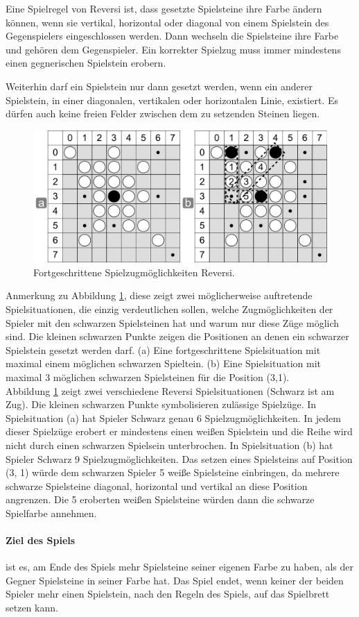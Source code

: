 Eine Spielregel von Reversi ist, dass gesetzte Spielsteine ihre Farbe ändern können, wenn sie vertikal, horizontal oder diagonal von einem Spielstein des Gegenspielers eingeschlossen werden. Dann wechseln die Spielsteine ihre Farbe und gehören dem Gegenspieler. Ein korrekter Spielzug muss immer mindestens einen gegnerischen Spielstein erobern. 

Weiterhin  darf ein Spielstein nur dann gesetzt werden, wenn ein anderer Spielstein, in einer diagonalen, vertikalen oder horizontalen Linie, existiert. Es dürfen auch keine freien Felder zwischen dem zu setzenden Steinen liegen. \\

\begin{figure}[!htbp]
  \centering
  \includegraphics[scale=0.5]{inhalt/abbildungen/zuege_schwarz_reversi.pdf}
  \caption{Fortgeschrittene Spielzugmöglichkeiten Reversi.}
  \label{fig:zuege_schwarz_reversi}
\end{figure}

Anmerkung zu Abbildung \ref{fig:zuege_schwarz_reversi}, diese zeigt zwei möglicherweise auftretende Spielsituationen, die einzig verdeutlichen sollen, welche Zugmöglichkeiten der Spieler mit den schwarzen Spielsteinen hat und warum nur diese Züge möglich sind. Die kleinen schwarzen Punkte zeigen die Positionen an denen ein schwarzer Spielstein gesetzt werden darf. (a) Eine fortgeschrittene Spielsituation mit maximal einem möglichen schwarzen Spieltein. (b) Eine Spielsituation mit maximal 3 möglichen schwarzen Spielsteinen für die Position (3,1). \\

Abbildung \ref{fig:zuege_schwarz_reversi} zeigt zwei verschiedene Reversi Spielsituationen (Schwarz ist am Zug). Die kleinen schwarzen Punkte symbolisieren zulässige Spielzüge. In Spielsituation (a) hat Spieler Schwarz genau 6 Spielzugmöglichkeiten. In jedem dieser Spielzüge erobert er mindestens einen weißen Spielstein und die Reihe wird nicht durch einen schwarzen Spielsein unterbrochen. In Spielsituation (b) hat Spieler Schwarz 9 Spielzugmöglichkeiten. Das setzen eines Spielsteins auf Position (3, 1) würde dem schwarzen Spieler 5 weiße Spielsteine einbringen, da mehrere schwarze Spielsteine diagonal, horizontal und vertikal an diese Position angrenzen. Die 5 eroberten weißen Spielsteine würden dann die schwarze Spielfarbe annehmen. \\

\paragraph{Ziel des Spiels} ist es, am Ende des Spiels mehr Spielsteine seiner eigenen Farbe zu haben, als der Gegner Spielsteine in seiner Farbe hat. Das Spiel endet, wenn keiner der beiden Spieler mehr einen Spielstein, nach den Regeln des Spiels, auf das Spielbrett setzen kann. \\